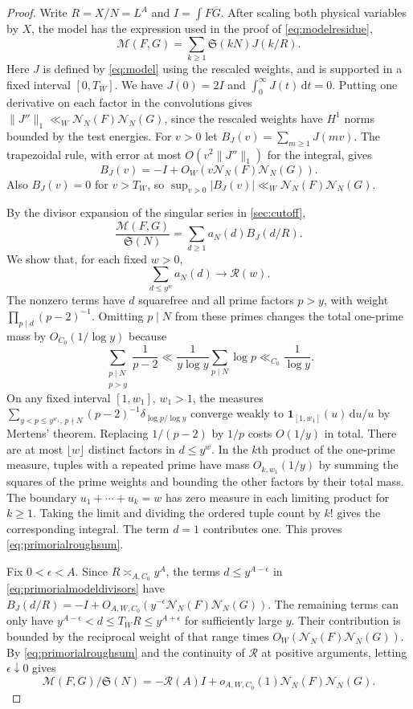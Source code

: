 \documentclass[11pt,a4paper]{article}
\numberwithin{equation}{section}
\newcommand{\SSS}{\mathfrak S}
\newcommand{\ud}{\mathrm d}
\newcommand{\NN}{\mathcal N_N}
\begin{document}
\begin{proof}
Write $R=X/N=L^A$ and $I=\int F\overline G$.
After scaling both physical variables by $X$, the model
has the expression used in the proof of
\cref{eq:modelresidue},
\[
 \mathcal M(F,G)=
       \sum_{k\ge1}\SSS(kN)J(k/R).
\]
Here $J$ is defined by \cref{eq:model} using the rescaled
weights, and is supported in a fixed interval $[0,T_W]$.
We have $J(0)=2I$ and $\int_0^\infty J(t)\,\ud t=0$.
Putting one derivative on each factor in the convolutions
gives $\|J''\|_{1}\ll_W\NN(F)\NN(G)$, since the rescaled
weights have $H^1$ norms bounded by the test energies.
For $v>0$ let $B_J(v)=\sum_{m\ge1}J(mv)$. The trapezoidal
rule, with error at most $O(v^2\|J''\|_1)$ for the
integral, gives
\[
 B_J(v)=-I+O_W(v\NN(F)\NN(G)).
\]
Also $B_J(v)=0$ for $v>T_W$, so
$\sup_{v>0}|B_J(v)|\ll_W\NN(F)\NN(G)$.

By the divisor expansion of the singular series in
\cref{sec:cutoff},
\begin{equation}
 \frac{\mathcal M(F,G)}{\SSS(N)}
     =\sum_{d\ge1}a_N(d)B_J(d/R).
 \label{eq:primorialmodeldivisors}
\end{equation}
We show that, for each fixed $w>0$,
\begin{equation}
 \sum_{d\le y^w}a_N(d)\longrightarrow \mathcal R(w).
 \label{eq:primorialroughsum}
\end{equation}
The nonzero terms have $d$ squarefree and all prime
factors $p>y$, with weight $\prod_{p\mid d}(p-2)^{-1}$.
Omitting $p\mid N$ from these primes changes the total
one-prime mass by $O_{C_0}(1/\log y)$ because
\[
 \sum_{\substack{p\mid N\\p>y}}\frac{1}{p-2}
   \ll\frac{1}{y\log y}\sum_{p\mid N}\log p
   \ll_{C_0}\frac1{\log y}.
\]
On any fixed interval $[1,w_1]$, $w_1>1$, the measures
$\sum_{y<p\le y^{w_1},\,p\nmid N}(p-2)^{-1}
\delta_{\log p/\log y}$ converge weakly to
$\mathbf 1_{[1,w_1]}(u)\,\ud u/u$ by Mertens' theorem.
Replacing $1/(p-2)$ by $1/p$ costs $O(1/y)$ in total.
There are at most $\lfloor w\rfloor$ distinct factors in
$d\le y^w$. In the $k$th product of the one-prime
measure, tuples with a repeated prime have mass
$O_{k,w_1}(1/y)$ by summing the squares of the prime
weights and bounding the other factors by their
total mass. The boundary $u_1+\cdots+u_k=w$ has
zero measure in each limiting product for $k\ge1$.
Taking the limit and dividing the ordered tuple
count by $k!$ gives the corresponding integral.
The term $d=1$ contributes one. This proves
\cref{eq:primorialroughsum}.

Fix $0<\epsilon<A$. Since $R\asymp_{A,C_0}y^A$,
the terms $d\le y^{A-\epsilon}$ in
\cref{eq:primorialmodeldivisors} have
$B_J(d/R)=-I+O_{A,W,C_0}(y^{-\epsilon}\NN(F)\NN(G))$.
The remaining terms can only have
$y^{A-\epsilon}<d\le T_WR\le y^{A+\epsilon}$ for
sufficiently large $y$. Their contribution is bounded
by the reciprocal weight of that range times
$O_W(\NN(F)\NN(G))$. By \cref{eq:primorialroughsum}
and the continuity of $\mathcal R$ at positive arguments,
letting $\epsilon\downarrow0$ gives
\[
 \mathcal M(F,G)/\SSS(N)
      =-\mathcal R(A)I+o_{A,W,C_0}(1)\NN(F)\NN(G).
\]


\end{proof}
\end{document}
